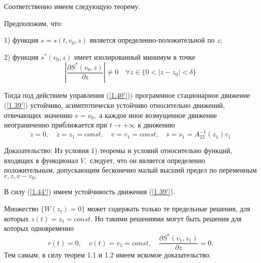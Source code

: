 Соответственно имеем следующую теорему.

\begin{theorem}\label{t-1.10}
Предположим, что:

1) функция $s = s(t, v_0, z)$ является определенно-положительной по $z$;

2) функция $s^{*} (v_0, z)$ имеет изолированный минимум в точке 
$$\left| \frac{\partial S^{*} (v_0, z)}{\partial z} \right| \ne 0 \quad \forall z \in \lbrace 0 < \left| z - z_0 \right| < \delta \rbrace$$

Тогда под действием управления (\ref{1.40'})) программное стационарное движение (\ref{1.39'}) устойчиво, асимптотически устойчиво относительно движений, отвечающих значению $v = v_0,$ а каждое иное возмущенное движение неограниченно приближается при $t \to + \infty$ к движению 
$$\dot z = 0, \quad \dot z = z_1 = const, \quad v = v_1 = const, \quad \dot s = \dot s_1 = A_{22}^{-1} (z_1) v_1$$
\end{theorem}

Доказательство:
Из условия 1) теоремы и условий относительно функций, входящих в функционал $V,$ следует, что он является определенно положительным, допускающим бесконечно малый высший предел по переменным $r, z, v - v_0.$

В силу (\ref{1.44'}) имеем устойчивость движения (\ref{1.39'}).

Множество $\lbrace W(z_t) = 0 \rbrace$ может содержать только те предельные решения, для которых $z(t) = z_1 = const.$ Но такими решениями могут быть решения для которых одновременно 
$$r(t) = 0, \quad v(t) = v_1 = const, \quad \frac{\partial S^{*} (v_1, z_1)}{\partial z} = 0.$$
Тем самым, в силу теорем 1.1 и 1.2 имеем искомое доказательство. 